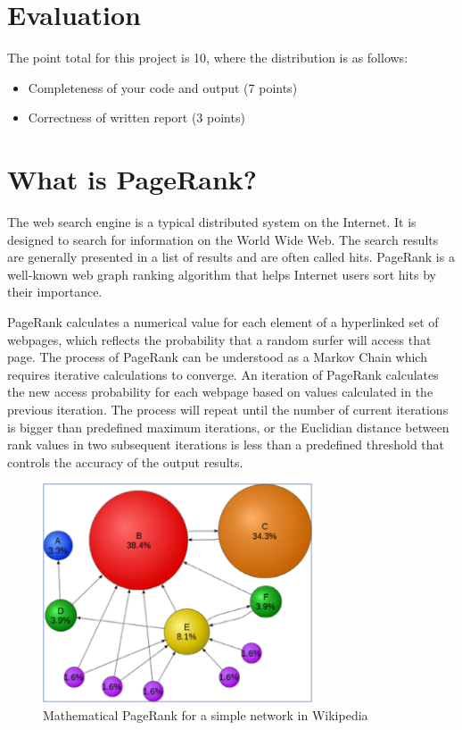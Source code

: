 \section*{Evaluation}
The point total for this project is 10, where the distribution is as follows:
\begin{itemize}
\item Completeness of your code and output (7 points)
\item Correctness of written report (3 points)
\end{itemize}

\section{What is PageRank?}
The web search engine is a typical distributed system on the Internet. It is
designed to search for information on the World Wide Web. The search results
are generally presented in a list of results and are often called hits.
PageRank is a well-known web graph ranking algorithm that helps Internet users
sort hits by their importance. 

PageRank calculates a numerical value for each element of a hyperlinked set of
webpages, which reflects the probability that a random surfer will access that
page. The process of PageRank can be understood as a Markov Chain which
requires iterative calculations to converge. An iteration of PageRank
calculates the new access probability for each webpage based on values
calculated in the previous iteration. The process will repeat until the number
of current iterations is bigger than predefined maximum iterations, or the
Euclidian distance between rank values in two subsequent iterations is less
than a predefined threshold that controls the accuracy of the output results. 

\begin{figure}[!htbp]
\centering
\includegraphics[width=8cm]{section/icloud/assignment/problems/project2/pagerankexample}
\caption{Mathematical PageRank for a simple network in Wikipedia}
\label{fig:pagerankexample}
\end{figure}

